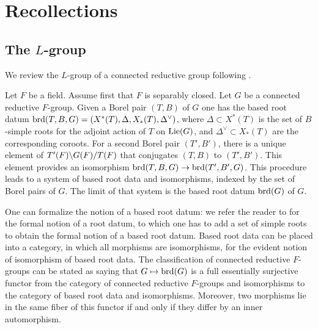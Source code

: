 \documentclass{article}
\theoremstyle{definition}
\numberwithin{equation}{section}
\renewcommand{\-}{\hyp{}}
\begin{document}
\section{Recollections} \label{sec:recoll}

\subsection{The $L$\-group}

We review the $L$\-group of a connected reductive group following \cite[\S2]{Vog93}.

Let $F$ be a field. Assume first that $F$ is separably closed. Let $G$ be a connected reductive $F$-group. Given a Borel pair $(T,B)$ of $G$ one has the based root datum $\textrm{brd}(T,B,G)=(X^*(T),\Delta,X_*(T),\Delta^\vee)$, where $\Delta \subset X^*(T)$ is the set of $B$-simple roots for the adjoint action of $T$ on $\textrm{Lie}(G)$, and $\Delta^\vee \subset X_*(T)$ are the corresponding coroots. For a second Borel pair $(T',B')$, there is a unique element of $T'(F)\backslash G(F)/T(F)$ that conjugates $(T,B)$ to $(T',B')$. This element provides an isomorphism $\textrm{brd}(T,B,G) \to \textrm{brd}(T',B',G)$. This procedure leads to a system of based root data and isomorphisms, indexed by the set of Borel pairs of $G$. The limit of that system is the based root datum $\textrm{brd}(G)$ of $G$.

One can formalize the notion of a based root datum: we refer the reader to \cite[\S7.4]{Spr98} for the formal notion of a root datum, to which one has to add a set of simple roots to obtain the formal notion of a based root datum. Based root data can be placed into a category, in which all morphisms are isomorphisms, for the evident notion of isomorphism of based root data. The classification of connected reductive $F$-groups \cite[Theorem 9.6.2, Theorem 10.1.1]{Spr98} can be stated as saying that $G \mapsto \textrm{brd}(G)$ is a full essentially surjective functor from the category of connected reductive $F$-groups and isomorphisms to the category of based root data and isomorphisms. Moreover, two morphisms lie in the same fiber of this functor if and only if they differ by an inner automorphism.
\end{document}
